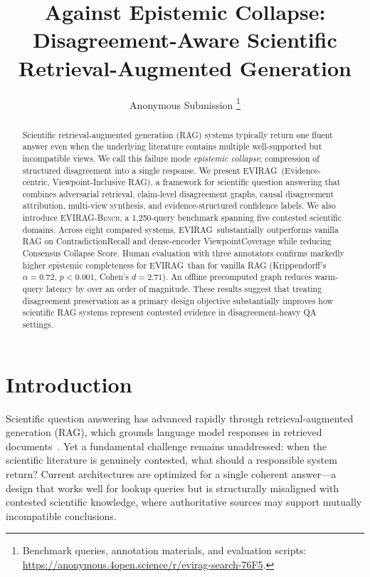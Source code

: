 \documentclass[11pt]{article}
\title{Against Epistemic Collapse: Disagreement-Aware Scientific\\
       Retrieval-Augmented Generation}
\author{Anonymous Submission%
\thanks{Benchmark queries, annotation materials, and evaluation scripts:
\url{https://anonymous.4open.science/r/evirag-search-76F5}.}}
\newcommand{\system}{\textsc{EVIRAG}\xspace}
\newcommand{\bench}{\textsc{EVIRAG-Bench}\xspace}
\begin{document}
\maketitle

\begin{abstract}
Scientific retrieval-augmented generation (RAG) systems typically return one
fluent answer even when the underlying literature contains multiple
well-supported but incompatible views.  We call this failure mode
\emph{epistemic collapse}: compression of structured disagreement into a single
response.  We present \system\ (Evidence-centric, Viewpoint-Inclusive RAG), a
framework for scientific question answering that combines adversarial retrieval,
claim-level disagreement graphs, causal disagreement attribution, multi-view
synthesis, and evidence-structured confidence labels.  We also introduce
\bench, a 1,250-query benchmark spanning five contested scientific domains.
Across eight compared systems, \system\ substantially outperforms vanilla RAG
on ContradictionRecall and dense-encoder ViewpointCoverage while
reducing Consensus Collapse Score.  Human evaluation with three annotators
confirms markedly higher epistemic completeness for \system\ than for vanilla
RAG (Krippendorff's $\alpha{=}0.72$, $p{<}0.001$, Cohen's $d{=}2.71$).
An offline precomputed graph reduces warm-query latency by over an order of
magnitude.  These results suggest that treating disagreement preservation as a
primary design objective substantially improves how scientific RAG systems
represent contested evidence in disagreement-heavy QA settings.
\end{abstract}

\section{Introduction}
\label{sec:intro}

Scientific question answering has advanced rapidly through retrieval-augmented
generation (RAG), which grounds language model responses in retrieved
documents~\citep{lewis2020rag}.  Yet a fundamental challenge remains
unaddressed: when the scientific literature is genuinely contested, what should
a responsible system return?  Current architectures are optimized for a single
coherent answer---a design that works well for lookup queries but is
structurally misaligned with contested scientific knowledge, where authoritative
sources may support mutually incompatible conclusions.
\end{document}
